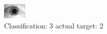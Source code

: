 \begin{figure}[h!]
\begin{center}
\includegraphics[width=0.60\columnwidth]{figures/ID1690_class_3_target_2.png}
\end{center}
\caption{ Classification: 3 actual target: 2}
\label{fig:ID1690_class_3_target_2}
\end{figure}

